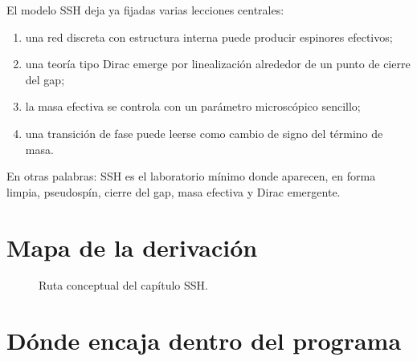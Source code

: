 El modelo SSH deja ya fijadas varias lecciones centrales:

\begin{enumerate}[leftmargin=*]
  \item una red discreta con estructura interna puede producir espinores efectivos;
  \item una teoría tipo Dirac emerge por linealización alrededor de un punto de cierre del gap;
  \item la masa efectiva se controla con un parámetro microscópico sencillo;
  \item una transición de fase puede leerse como cambio de signo del término de masa.
\end{enumerate}

En otras palabras: SSH es el laboratorio mínimo donde aparecen, en forma limpia, pseudospín, cierre del gap, masa efectiva y Dirac emergente.

\section{Mapa de la derivación}

\begin{figure}[ht]
\centering
{}
\caption{Ruta conceptual del capítulo SSH.}
\label{c01:fig:ssh-roadmap}
\end{figure}

\section{Dónde encaja dentro del programa}

